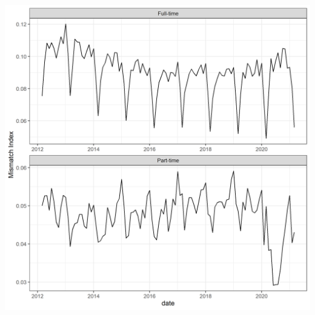 \documentclass[
]{book}
\begin{document}
\includegraphics[width=31.11in]{R/figure/occ_mismatch}

  
\end{document}

